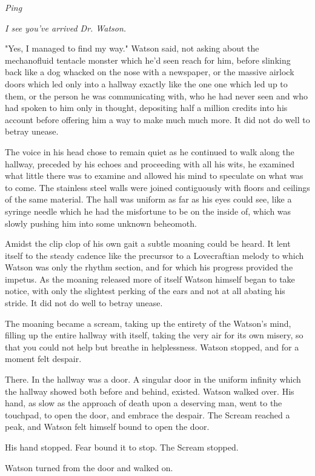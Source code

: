 \documentclass[12pt]{article}
\begin{document}
\emph{Ping}

\emph{I see you've arrived Dr. Watson.}

"Yes, I managed to find my way." Watson said, not asking about the mechanofluid tentacle monster which he'd seen reach for him, before slinking back like a dog whacked on the nose with a newspaper, or the massive airlock doors which led only into a hallway exactly like the one one which led up to them, or the person he was communicating with, who he had never seen and who had spoken to him only in thought, depositing half a million credits into his account before offering him a way to make much much more. It did not do well to betray unease.

The voice in his head chose to remain quiet as he continued to walk along the hallway, preceded by his echoes and proceeding with all his wits, he examined what little there was to examine and allowed his mind to speculate on what was to come. The stainless steel walls were joined contiguously with floors and ceilings of the same material. The hall was uniform as far as his eyes could see, like a syringe needle which he had the misfortune to be on the inside of, which was slowly pushing him into some unknown beheomoth.

Amidst the clip clop of his own gait a subtle moaning could be heard. It lent itself to the steady cadence like the precursor to a Lovecraftian melody to which Watson was only the rhythm section, and for which his progress provided the impetus. As the moaning released more of itself Watson himself began to take notice, with only the slightest perking of the ears and not at all abating his stride. It did not do well to betray unease.

The moaning became a scream, taking up the entirety of the Watson's mind, filling up the entire hallway with itself, taking the very air for its own misery, so that you could not help but breathe in helplessness. Watson stopped, and for a moment felt despair.

There. In the hallway was a door. A singular door in the uniform infinity which the hallway showed both before and behind, existed. Watson walked over. His hand, as slow as the approach of death upon a deserving man, went to the touchpad, to open the door, and embrace the despair. The Scream reached a peak, and Watson felt himself bound to open the door. 

His hand stopped. Fear bound it to stop. The Scream stopped.

Watson turned from the door and walked on.
\end{document}
